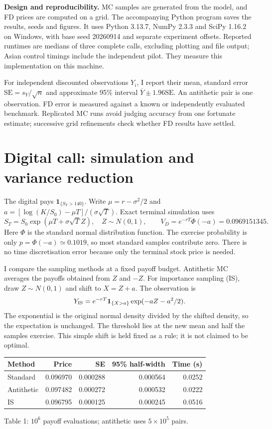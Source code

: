 \documentclass[12pt]{article}
\theoremstyle{definition}
\newcommand{\ind}{\mathbf{1}}
\begin{document}
\textbf{Design and reproducibility.}
MC samples are generated from the model, and FD prices are computed on a grid.
The accompanying Python program saves the results, seeds and figures. It uses Python 3.13.7, NumPy 2.3.3
and SciPy 1.16.2 on Windows, with base seed 20260914 and separate experiment offsets.
Reported runtimes are medians of three complete calls, excluding plotting and file
output; Asian control timings include the independent pilot. They measure this
implementation on this machine.

For independent discounted observations $Y_i$, I report their mean, standard error
$\mathrm{SE}=s_Y/\sqrt n$ and approximate 95\% interval
$\overline Y\pm1.96\mathrm{SE}$. An antithetic pair is one observation. FD error is
measured against a known or independently evaluated benchmark. Replicated MC runs
avoid judging accuracy from one fortunate estimate; successive grid refinements
check whether FD results have settled.

\newpage
\section{Digital call: simulation and variance reduction}
The digital pays $\ind_{\{S_T>140\}}$. Write $\mu=r-\sigma^2/2$ and
$a=[\log(K/S_0)-\mu T]/(\sigma\sqrt T)$. Exact terminal simulation uses
\[
S_T=S_0\exp(\mu T+\sigma\sqrt T Z),\quad Z\sim N(0,1),\qquad
V_D=e^{-rT}\Phi(-a)=0.0969151345.
\]
Here $\Phi$ is the standard normal distribution function. The exercise probability is
only $p=\Phi(-a)\simeq0.1019$, so most standard samples contribute zero. There is no
time discretisation error because only the terminal stock price is needed.

I compare the sampling methods at a fixed payoff budget.
Antithetic MC averages the payoffs obtained from $Z$ and $-Z$. For importance sampling
(IS), draw $Z\sim N(0,1)$ and shift to $X=Z+a$. The observation is
\[
Y_{\rm IS}=e^{-rT}\ind_{\{X>a\}}\exp(-aZ-a^2/2).
\]
The exponential is the original normal density divided by the shifted density, so the
expectation is unchanged. The threshold lies at the new mean and half the samples
exercise. This simple shift is held fixed as a rule; it is not claimed to be optimal.

\begin{center}
\begin{tabular}{lrrrr}
\hline
Method&Price&SE&95\% half-width&Time (s)\\\hline
Standard & 0.096970 & 0.000288 & 0.000564 & 0.0252 \\
Antithetic & 0.097482 & 0.000272 & 0.000532 & 0.0222 \\
IS & 0.096795 & 0.000125 & 0.000245 & 0.0516 \\
\hline
\end{tabular}

Table 1: $10^6$ payoff evaluations; antithetic uses $5\times10^5$ pairs.
\end{center}
\end{document}
